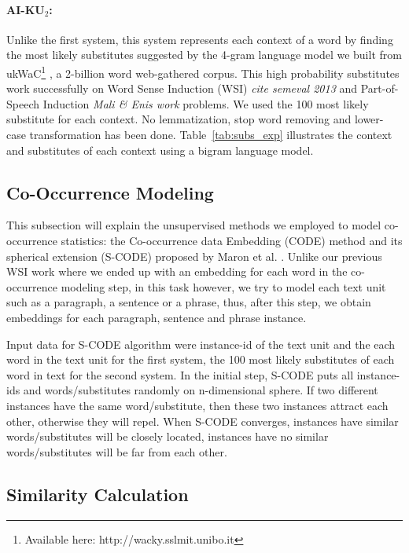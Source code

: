 \documentclass[11pt]{article}
\begin{document}
\paragraph{AI-KU$_2$:} Unlike the first system, this system represents each context of a word by finding the most likely substitutes suggested by the 4-gram language model we built from ukWaC\footnote{Available here: http://wacky.sslmit.unibo.it} \cite{ukWaC}, a 2-billion word web-gathered corpus. This high probability substitutes work successfully on Word Sense Induction (WSI) \emph{cite semeval 2013} and Part-of-Speech Induction \emph{Mali \& Enis work} problems. We used the 100 most likely substitute for each context. No lemmatization, stop word removing and lower-case transformation has been done. Table~\ref{tab:subs_exp} illustrates the context and substitutes of each context using a bigram language model.



\subsection{Co-Occurrence Modeling}

This subsection will explain the unsupervised methods we employed to model co-occurrence statistics: the Co-occurrence data Embedding (CODE) method \cite{globerson-CODE} and its spherical extension (S-CODE) proposed by Maron et al. . Unlike our previous WSI work \cite{baskaya13ai} where we ended up with an embedding for each
word in the co-occurrence modeling step, in this task however, we try to model each text unit such as a paragraph, a sentence or a phrase, thus, after this step, we obtain embeddings for each paragraph, sentence and phrase instance. 

Input data for S-CODE algorithm were instance-id of the text unit and the each word in the text unit for the first system, the 100 most likely substitutes of each word in text for the second system. In the initial step, S-CODE puts all instance-ids and words/substitutes randomly on n-dimensional sphere. If two different instances have the same word/substitute, then these two instances attract each other, otherwise they will repel. When S-CODE converges, instances have similar words/substitutes will be closely located, instances have no similar words/substitutes will be far from each other. 



\subsection{Similarity Calculation}
\end{document}
